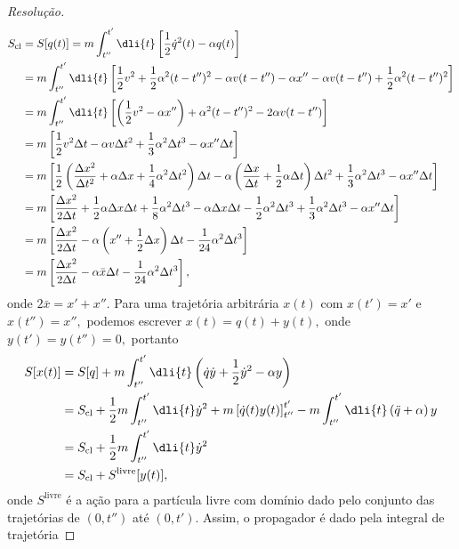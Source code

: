 \begin{proof}[Resolução]
\begin{align*}
      S_{\mathrm{cl}} &= S[q(t)] = m\int_{t''}^{t'} \dli{t} \left[\frac12 \dot{q}^2(t) - \alpha q(t)\right]\\
                      &= m \int_{t''}^{t'} \dli{t}\left[\frac12 v^2 + \frac12 \alpha^2 (t-t'')^2 - \alpha v (t - t'') - \alpha x'' - \alpha v(t - t'') + \frac12 \alpha^2 (t - t'')^2\right]\\
                      &= m \int_{t''}^{t'} \dli{t} \left[\left(\frac12 v^2 - \alpha x''\right) + \alpha^2(t - t'')^2 - 2 \alpha v (t - t'')\right]\\
                      &= m \left[\frac12 v^2 \Delta t- \alpha v \Delta t^2 + \frac13 \alpha^2 \Delta t^3 - \alpha x'' \Delta t\right]\\
                      &= m\left[\frac12\left(\frac{\Delta x^2}{\Delta t^2} + \alpha \Delta x + \frac14 \alpha^2 \Delta t^2\right)\Delta t - \alpha \left(\frac{\Delta x}{\Delta t} + \frac12 \alpha \Delta t\right) \Delta t^2 + \frac13 \alpha^2 \Delta t^3 - \alpha x'' \Delta t\right]\\
                      &= m\left[\frac{\Delta x^2}{2 \Delta t} + \frac12 \alpha \Delta x \Delta t + \frac18 \alpha^2 \Delta t^3 - \alpha \Delta x \Delta t - \frac12 \alpha^2 \Delta t^3 + \frac13 \alpha^2 \Delta t^3 - \alpha x'' \Delta t\right]\\
                      &= m \left[\frac{\Delta x^2}{2 \Delta t} -\alpha \left(x'' + \frac12\Delta x\right) \Delta t - \frac1{24} \alpha^2 \Delta t^3\right]\\
                      &= m \left[\frac{\Delta x^2}{2 \Delta t} -\alpha \bar{x}\Delta t - \frac1{24} \alpha^2 \Delta t^3\right],
   \end{align*}
   onde \(2\bar{x} = x' + x''.\) Para uma trajetória arbitrária \(x(t)\) com \(x(t') = x'\) e \(x(t'') = x'',\) podemos escrever \(x(t) = q(t) + y(t),\) onde \(y(t') = y(t'') = 0,\) portanto
   \begin{align*}
      S[x(t)] &= S[q] + m \int_{t''}^{t'} \dli{t} \left(\dot{q} \dot{y} + \frac12\dot{y}^2 - \alpha y\right)\\
              &= S_{\mathrm{cl}} + \frac12 m \int_{t''}^{t'} \dli{t} \dot{y}^2 + m \left[\dot{q}(t) y(t)\right]_{t''}^{t'} - m \int_{t''}^{t'} \dli{t} \left(\ddot{q} + \alpha\right)y\\
              &= S_{\mathrm{cl}} + \frac12 m \int_{t''}^{t'} \dli{t} \dot{y}^2\\
              &= S_{\mathrm{cl}} + S^{\mathrm{livre}}[y(t)],
   \end{align*}
   onde \(S^{\mathrm{livre}}\) é a ação para a partícula livre com domínio dado pelo conjunto das trajetórias de \((0, t'')\) até \((0, t')\). Assim, o propagador é dado pela integral de trajetória

\end{proof}
